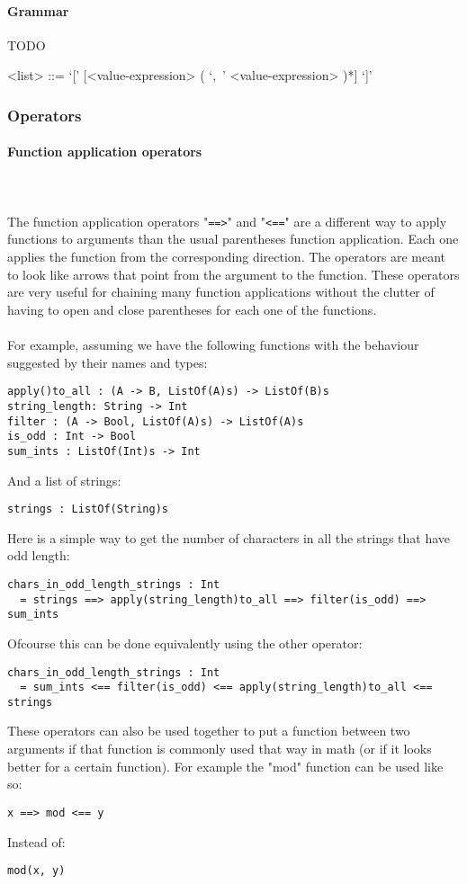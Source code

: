 \documentclass{article}
\def\pend{\mbox{} \\\\}
\begin{document}
\paragraph{Grammar}
TODO
\begin{grammar}
<list> ::= `[' [<value-expression> ( `,\ ' <value-expression> )*] `]'
\end{grammar}

\subsubsection{Operators}

\paragraph{Function application operators}\pend
The function application operators "\texttt{==>}" and "\texttt{<==}" are a different
way to apply functions to arguments than the usual parentheses function application.
Each one applies the function from the corresponding direction. The operators are 
meant to look like arrows that point from the argument to the function.
These operators are very useful for chaining many function applications without the
clutter of having to open and close parentheses for each one of the functions.\\\\
For example, assuming we have the following functions with the behaviour suggested
by their names and types:
\begin{verbatim}
apply()to_all : (A -> B, ListOf(A)s) -> ListOf(B)s
string_length: String -> Int
filter : (A -> Bool, ListOf(A)s) -> ListOf(A)s
is_odd : Int -> Bool
sum_ints : ListOf(Int)s -> Int
\end{verbatim}
And a list of strings:
\begin{verbatim}
strings : ListOf(String)s
\end{verbatim}
Here is a simple way to get the number of characters in all the strings that have 
odd length:
\begin{verbatim}
chars_in_odd_length_strings : Int
  = strings ==> apply(string_length)to_all ==> filter(is_odd) ==> sum_ints
\end{verbatim}
Ofcourse this can be done equivalently using the other operator:
\begin{verbatim}
chars_in_odd_length_strings : Int
  = sum_ints <== filter(is_odd) <== apply(string_length)to_all <== strings
\end{verbatim}
These operators can also be used together to put a function between two arguments
if that function is commonly used that way in math (or if it looks better for a
certain function). For example the "mod" function can be used like so:
\begin{verbatim}
x ==> mod <== y
\end{verbatim}
Instead of:
\begin{verbatim}
mod(x, y)
\end{verbatim}
\end{document}
